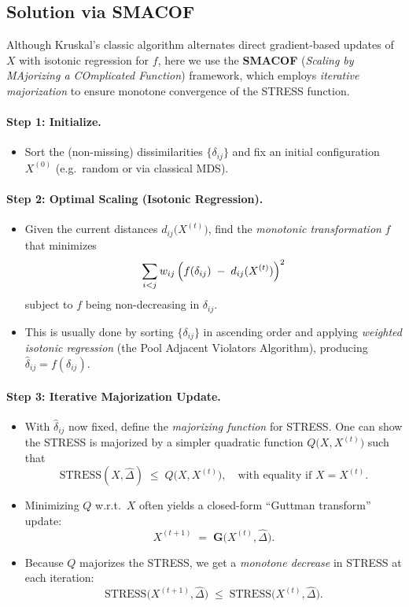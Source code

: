 \subsection{Solution via SMACOF}
Although Kruskal's classic algorithm alternates direct gradient-based updates of $X$ with isotonic regression for $f$, here we use the \textbf{SMACOF} (\emph{Scaling by MAjorizing a COmplicated Function}) framework, which employs \emph{iterative majorization} to ensure monotone convergence of the STRESS function.

\paragraph{Step 1: Initialize.}
\begin{itemize}
  \item Sort the (non-missing) dissimilarities $\{\delta_{ij}\}$ and fix an initial configuration $X^{(0)}$ (e.g.\ random or via classical MDS).
\end{itemize}

\paragraph{Step 2: Optimal Scaling (Isotonic Regression).}
\begin{itemize}
  \item Given the current distances $d_{ij}\bigl(X^{(t)}\bigr)$, find the \emph{monotonic transformation} $f$ that minimizes
  \[
    \sum_{i<j} w_{ij}\,\Bigl(f(\delta_{ij}) \;-\; d_{ij}(X^{(t)})\Bigr)^2
  \]
  subject to $f$ being non-decreasing in $\delta_{ij}$.  
  \item This is usually done by sorting $\{\delta_{ij}\}$ in ascending order and applying \emph{weighted isotonic regression} (the Pool Adjacent Violators Algorithm), producing $\hat{\delta}_{ij} = f(\delta_{ij})$.
\end{itemize}

\paragraph{Step 3: Iterative Majorization Update.}
\begin{itemize}
  \item With $\hat{\delta}_{ij}$ now fixed, define the \emph{majorizing function} for STRESS.  One can show the STRESS is majorized by a simpler quadratic function $Q\bigl(X, X^{(t)}\bigr)$ such that
  \[
    \mathrm{STRESS}(X,\hat{\Delta})
    \;\le\;
    Q\bigl(X, X^{(t)}\bigr),
    \quad
    \text{with equality if } X = X^{(t)}.
  \]
  \item Minimizing $Q$ w.r.t.\ $X$ often yields a closed-form “Guttman transform” update:
  \[
    X^{(t+1)} \;=\; \mathbf{G}\bigl(X^{(t)}, \hat{\Delta}\bigr).
  \]
  \item Because $Q$ majorizes the STRESS, we get a \emph{monotone decrease} in STRESS at each iteration:
  \[
    \mathrm{STRESS}\bigl(X^{(t+1)}, \hat{\Delta}\bigr) \;\le\;
    \mathrm{STRESS}\bigl(X^{(t)}, \hat{\Delta}\bigr).
  \]
\end{itemize}

